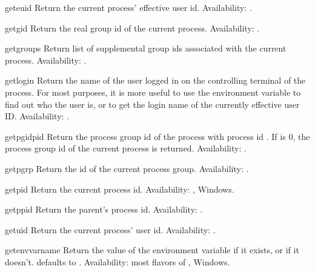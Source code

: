\begin{funcdesc}{geteuid}{}
Return the current process' effective user id.
Availability: \UNIX.
\end{funcdesc}

\begin{funcdesc}{getgid}{}
Return the real group id of the current process.
Availability: \UNIX.
\end{funcdesc}

\begin{funcdesc}{getgroups}{}
Return list of supplemental group ids associated with the current
process.
Availability: \UNIX.
\end{funcdesc}

\begin{funcdesc}{getlogin}{}
Return the name of the user logged in on the controlling terminal of
the process.  For most purposes, it is more useful to use the
environment variable  to find out who the user is,
or  to get the login name
of the currently effective user ID.
Availability: \UNIX.
\end{funcdesc}

\begin{funcdesc}{getpgid}{pid}
Return the process group id of the process with process id .
If  is 0, the process group id of the current process is
returned. Availability: \UNIX.
\end{funcdesc}

\begin{funcdesc}{getpgrp}{}
Return the id of the current process group.
Availability: \UNIX.
\end{funcdesc}

\begin{funcdesc}{getpid}{}
Return the current process id.
Availability: \UNIX, Windows.
\end{funcdesc}

\begin{funcdesc}{getppid}{}
Return the parent's process id.
Availability: \UNIX.
\end{funcdesc}

\begin{funcdesc}{getuid}{}
Return the current process' user id.
Availability: \UNIX.
\end{funcdesc}

\begin{funcdesc}{getenv}{varname}
Return the value of the environment variable  if it
exists, or  if it doesn't.   defaults to
.
Availability: most flavors of \UNIX, Windows.
\end{funcdesc}

